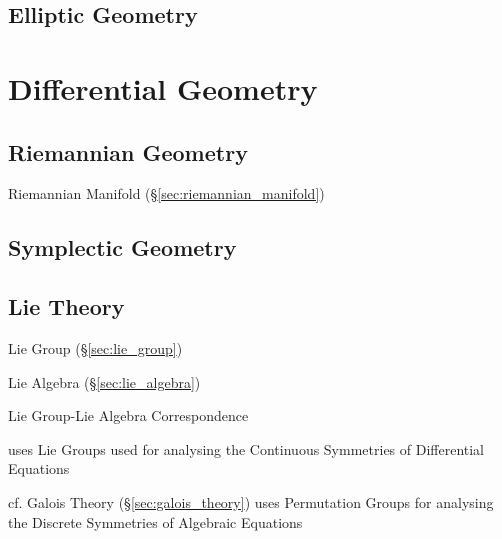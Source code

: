 \subsection{Elliptic Geometry}\label{sec:elliptic_geometry}



\section{Differential Geometry}\label{sec:differential_geometry}

\subsection{Riemannian Geometry}\label{sec:riemannian_geometry}

Riemannian Manifold (\S\ref{sec:riemannian_manifold})



\subsection{Symplectic Geometry}\label{sec:symplectic_geometry}

\subsection{Lie Theory}\label{sec:lie_theory}

Lie Group (\S\ref{sec:lie_group})

Lie Algebra (\S\ref{sec:lie_algebra})

Lie Group-Lie Algebra Correspondence

uses Lie Groups used for analysing the Continuous Symmetries of
Differential Equations %

cf. Galois Theory (\S\ref{sec:galois_theory}) uses Permutation Groups
for analysing the Discrete Symmetries of Algebraic Equations %



